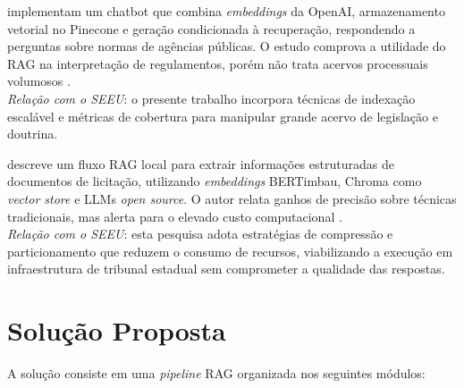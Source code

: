 implementam um chatbot que combina
\textit{embeddings} da OpenAI, armazenamento vetorial no Pinecone e geração
condicionada à recuperação, respondendo a perguntas sobre normas de agências
públicas. O estudo comprova a utilidade do RAG na interpretação de regulamentos,
porém não trata acervos processuais volumosos \cite{pujiono2024implementing}.\\
\emph{Relação com o SEEU}: o presente trabalho incorpora técnicas de indexação
escalável e métricas de cobertura para manipular grande acervo de legislação e
doutrina.

 descreve um fluxo RAG local para extrair
informações estruturadas de documentos de licitação, utilizando
\textit{embeddings} BERTimbau, Chroma como \textit{vector store} e LLMs
\textit{open source}. O autor relata ganhos de precisão sobre técnicas
tradicionais, mas alerta para o elevado custo computacional
\cite{aquino2024extracting}.\\
\emph{Relação com o SEEU}: esta pesquisa adota estratégias de compressão e
particionamento que reduzem o consumo de recursos, viabilizando a execução em
infraestrutura de tribunal estadual sem comprometer a qualidade das respostas.


\section{Solução Proposta}
\label{sub:solucao-proposta}

A solução consiste em uma \textit{pipeline} RAG organizada nos seguintes
módulos:

